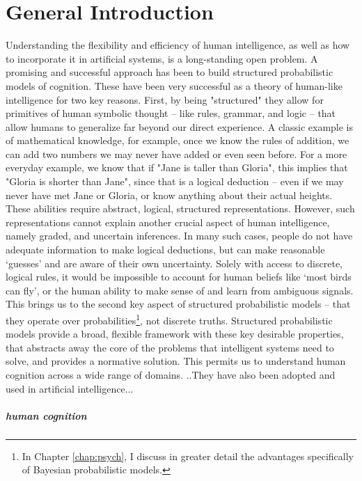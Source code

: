 \chapter{General Introduction}
\label{chap:intro}

Understanding the flexibility and efficiency of human intelligence, as well as how to incorporate it in artificial systems, is a long-standing open problem. A promising and successful approach has been to build structured probabilistic models of cognition. These have been very successful as a theory of human-like intelligence for two key reasons. First, by being "structured" they allow for primitives of human symbolic thought -- like rules, grammar, and logic -- that allow humans to generalize far beyond our direct experience\cite{fodor88, chomsky2002syntactic}. A classic example is of mathematical knowledge, for example, once we know the rules of addition, we can add two numbers we may never have added or even seen before. For a more everyday example, we know that if "Jane is taller than Gloria", this implies that "Gloria is shorter than Jane", since that is a logical deduction -- even if we may never have met Jane or Gloria, or know anything about their actual heights. These abilities require abstract, logical, structured representations. However, such representations cannot explain another crucial aspect of human intelligence, namely graded, and uncertain inferences\cite{rogers2004semantic}. In many such cases, people do not have adequate information to make logical deductions, but can make reasonable `guesses' and are aware of their own uncertainty. Solely with access to discrete, logical rules, it would be impossible to account for human beliefs like `most birds can fly', or the human ability to make sense of and learn from ambiguous signals. This brings us to the second key aspect of structured probabilistic models -- that they operate over probabilities\footnote{In Chapter \ref{chap:psych}, I discuss in greater detail the advantages specifically of Bayesian probabilistic models.}, not discrete truths. Structured probabilistic models provide a broad, flexible framework with these key desirable properties, that abstracts away the core of the problems that intelligent systems need to solve, and provides a normative solution. This permits us to understand human cognition across a wide range of domains. ..They have also been adopted and used in artificial intelligence... 

\paragraph{human cognition}

